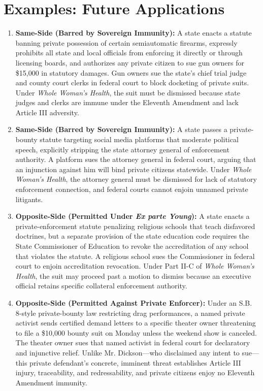 \documentclass[12pt]{article}
\begin{document}
\section{Examples: Future Applications}

\begin{enumerate}
    \item \textbf{Same-Side (Barred by Sovereign Immunity):} A state enacts a statute banning private possession of certain semiautomatic firearms, expressly prohibits all state and local officials from enforcing it directly or through licensing boards, and authorizes any private citizen to sue gun owners for \$15,000 in statutory damages. Gun owners sue the state's chief trial judge and county court clerks in federal court to block docketing of private suits. Under \textit{Whole Woman's Health}, the suit must be dismissed because state judges and clerks are immune under the Eleventh Amendment and lack Article III adversity.
    \item \textbf{Same-Side (Barred by Sovereign Immunity):} A state passes a private-bounty statute targeting social media platforms that moderate political speech, explicitly stripping the state attorney general of enforcement authority. A platform sues the attorney general in federal court, arguing that an injunction against him will bind private citizens statewide. Under \textit{Whole Woman's Health}, the attorney general must be dismissed for lack of statutory enforcement connection, and federal courts cannot enjoin unnamed private litigants.
    \item \textbf{Opposite-Side (Permitted Under \textit{Ex parte Young}):} A state enacts a private-enforcement statute penalizing religious schools that teach disfavored doctrines, but a separate provision of the state education code requires the State Commissioner of Education to revoke the accreditation of any school that violates the statute. A religious school sues the Commissioner in federal court to enjoin accreditation revocation. Under Part II-C of \textit{Whole Woman's Health}, the suit may proceed past a motion to dismiss because an executive official retains specific collateral enforcement authority.
    \item \textbf{Opposite-Side (Permitted Against Private Enforcer):} Under an S.B. 8-style private-bounty law restricting drag performances, a named private activist sends certified demand letters to a specific theater owner threatening to file a \$10,000 bounty suit on Monday unless the weekend show is canceled. The theater owner sues that named activist in federal court for declaratory and injunctive relief. Unlike Mr. Dickson---who disclaimed any intent to sue---this private defendant's concrete, imminent threat establishes Article III injury, traceability, and redressability, and private citizens enjoy no Eleventh Amendment immunity.

\end{enumerate}
\end{document}
